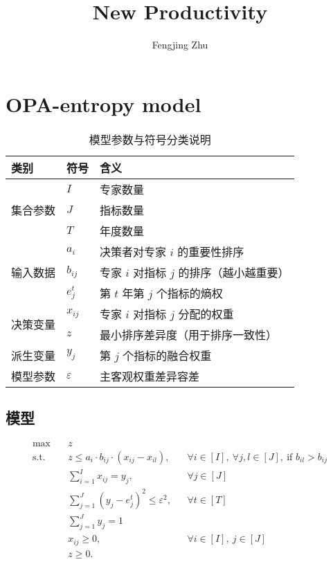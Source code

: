 \documentclass[11pt]{article}
\title{New Productivity}
\author{Fengjing Zhu}
\begin{document}
\vspace{-5pt}

\section{OPA-entropy model}
\label{sec:OPA-entropy}



\begin{table}[h]
\centering
\caption{模型参数与符号分类说明}
\begin{tabular}{lll}
\toprule
\textbf{类别} & \textbf{符号} & \textbf{含义} \\
\midrule
\multirow{3}{*}{集合参数}
& $I$ & 专家数量  \\
& $J$ & 指标数量  \\
& $T$ & 年度数量  \\
\midrule
\multirow{3}{*}{输入数据}
& $a_i$ & 决策者对专家 $i$ 的重要性排序 \\
& $b_{ij}$ & 专家 $i$ 对指标 $j$ 的排序（越小越重要） \\
& $e_j^t$ & 第 $t$ 年第 $j$ 个指标的熵权 \\
\midrule
\multirow{2}{*}{决策变量}
& $x_{ij}$ & 专家 $i$ 对指标 $j$ 分配的权重 \\
& $z$ & 最小排序差异度（用于排序一致性） \\
\midrule
派生变量
& $y_j  $ & 第 $j$ 个指标的融合权重 \\
\midrule
模型参数
& $\varepsilon$ & 主客观权重差异容差 \\
\bottomrule
\end{tabular}
\end{table}



\subsection*{模型}

\begin{align*}
\max \quad & z \\
\text{s.t.} \quad 
& z \le a_i \cdot b_{ij} \cdot (x_{ij} - x_{il}), 
&& \forall i \in [I],\ \forall j,l \in [J],\ \text{if } b_{il} > b_{ij} \\
&\sum_{i=1}^I x_{ij} = y_j,&& \forall j \in [J] \\
& \sum_{j=1}^J \left( y_j - e_j^t \right)^2 \le \varepsilon^2,
&& \forall t \in [T] \\
& \sum_{j=1}^J y_j= 1 \\
& x_{ij} \ge 0, && \forall i\in [I],\ j \in [J] \\
& z \ge 0.
\end{align*}

\end{document}
